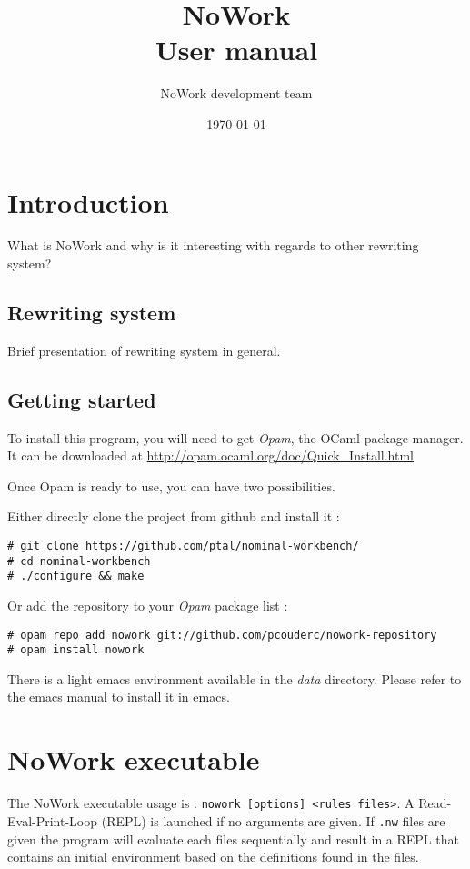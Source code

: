 \documentclass[12pt,a4paper]{article}
\title{NoWork\\
User manual}
\author{NoWork development team\\[2em]}
\date\today
\begin{document}
\maketitle


\section{Introduction}
What is NoWork and why is it interesting with regards to other rewriting system?

\subsection{Rewriting system}
Brief presentation of rewriting system in general.

\subsection{Getting started}
To install this program, you will need to get \emph{Opam}, the OCaml package-manager.
It can be downloaded at \url{http://opam.ocaml.org/doc/Quick_Install.html}

Once Opam is ready to use, you can have two possibilities. 

Either directly clone the project from github and install it :
\begin{verbatim}
# git clone https://github.com/ptal/nominal-workbench/
# cd nominal-workbench
# ./configure && make
\end{verbatim}

Or add the repository to your \emph{Opam} package list :
\begin{verbatim}
# opam repo add nowork git://github.com/pcouderc/nowork-repository
# opam install nowork
\end{verbatim}

There is a light emacs environment available in the \emph{data}
directory. Please refer to the emacs manual to install it in emacs.

\section{NoWork executable}

The NoWork executable usage is : \texttt{nowork [options] <rules
  files>}.  A Read-Eval-Print-Loop (REPL) is launched if no arguments
are given. If \texttt{.nw} files are given the program will evaluate
each files sequentially and result in a REPL that contains an initial
environment based on the definitions found in the files.
\end{document}

